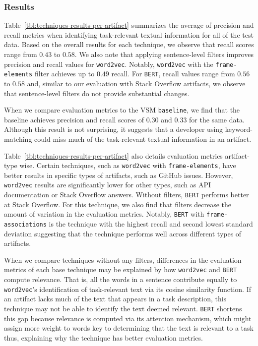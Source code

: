 \subsubsection{Results}


Table~\ref{tbl:techniques-results-per-artifact} summarizes the average of precision and recall metrics when identifying task-relevant textual information for all of the test data.
Based on the overall results for each technique, we observe that recall scores range from $0.43$ to $0.58$. 
We also note that applying sentence-level filters improves precision and recall values for \texttt{word2vec}. Notably, \texttt{word2vec} with the \texttt{frame-elements} filter achieves up to $0.49$ recall.
For \texttt{BERT}, recall values range from $0.56$ to $0.58$ and, similar to our evaluation with Stack Overflow artifacts,  we observe that sentence-level filters do not provide substantial changes. 



When we compare evaluation metrics to the \acs{VSM} \texttt{baseline}, we find that the baseline achieves precision and recall scores of $0.30$ and $0.33$ for the same data. 
Although this result is not surprising, it suggests that a developer using keyword-matching could miss much of the task-relevant textual information in an artifact.


Table~\ref{tbl:techniques-results-per-artifact} also details
evaluation metrics artifact-type wise.
Certain techniques, such as \texttt{word2vec} with \texttt{frame-elements}, have better results in specific 
types of artifacts, such as GitHub issues. However, \texttt{word2vec} results are significantly lower 
for other types, such as API documentation or Stack Overflow answers. 
Without filters, \texttt{BERT} performs better at Stack Overflow. For this technique,
we also find that filters decrease 
the amount of variation in the evaluation metrics. Notably, 
\texttt{BERT} with \texttt{frame-associations} is the technique with the highest recall and 
second lowest standard deviation 
suggesting that the technique performs well across different types of artifacts.



\afterpage{
    
}



When we compare techniques without any filters, differences in the evaluation metrics of each base technique may be explained by how  \texttt{word2vec} and \texttt{BERT} compute relevance. 
That is, all the words in a sentence  contribute equally to \texttt{word2vec}'s identification of task-relevant text via its cosine similarity function.
If an artifact lacks much of the text that appears in a task description, this technique may not be able to identify the text deemed relevant. 
\texttt{BERT} shortens this gap because relevance is computed via its attention mechanism, which might assign more 
weight to words key to determining that the text is relevant to a task thus, explaining why the technique has better evaluation metrics.


